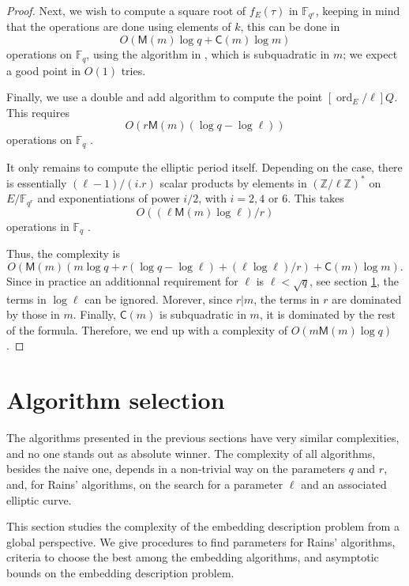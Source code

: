 \documentclass[12pt]{article}
\theoremstyle{plain}
\theoremstyle{definition}
\DeclareMathOperator{\order}{ord} %
\def\Z{\ensuremath{\mathbb{Z}}}
\def\F{\ensuremath{\mathbb{F}}}
\def\MM{\ensuremath{\mathsf{M}}}
\def\CC{\ensuremath{\mathsf{C}}}
\newcounter{algorithm}
\begin{document}
\begin{proof}
Next, we wish to compute a square root of $f_E(\tau)$ in $\F_{q^r}$, keeping in
mind that the operations are done using elements of $k$, this can be done in 
\begin{equation}
O(\MM(m)\log{q} + \CC(m)\log{m})
\end{equation}
operations on $\F_q$, using the algorithm in \cite{javad'spaper}, which is
subquadratic in $m$; we expect a good point in $O(1)$ tries.

Finally, we use a double and add algorithm to compute the point 
$[\order_E/\ell]Q$. This requires 
\begin{equation}
O(r\MM(m)(\log{q}-\log{\ell}))
\end{equation}
operations on $\F_q$ \cite{}.

It only remains to compute the elliptic period itself. Depending on the case,
there is essentially $(\ell-1)/(i.r)$ scalar products by elements in
$(\Z/\ell\Z)^{\ast}$ on $E/\F_{q^r}$ and exponentiations of power $i/2$, with 
$i=2,4$ or $6$. This takes 
\begin{equation}
O((\ell\MM(m)\log{\ell})/r)
\end{equation}
operations in $\F_q$ \cite{}.

Thus, the complexity is 
\[
O(\MM(m)(m\log{q}+r(\log{q}-\log{\ell})+
(\ell\log{\ell})/r)+\CC(m)\log{m}).
\]
Since in practice an additionnal requirement for $\ell$ is $\ell < \sqrt{q}$,
see section \ref{sec:selection}, the terms in $\log{\ell}$ can be ignored. 
Morever, since $r|m$, the terms in $r$ are dominated by those in $m$. Finally, 
$\CC(m)$ is subquadratic in $m$, it is dominated by the rest of the formula. 
Therefore, we end up with a complexity of $O(m\MM(m)\log{q})$.
\end{proof}

\section{Algorithm selection}
\label{sec:selection}

The algorithms presented in the previous sections have very similar
complexities, and no one stands out as absolute winner. The complexity
of all algorithms, besides the naive one, depends in a non-trivial way
on the parameters $q$ and $r$, and, for Rains' algorithms, on the
search for a parameter $\ell$ and an associated elliptic curve.

This section studies the complexity of the embedding description
problem from a global perspective. We give procedures to find
parameters for Rains' algorithms, criteria to choose the best among
the embedding algorithms, and asymptotic bounds on the embedding
description problem.
\end{document}
